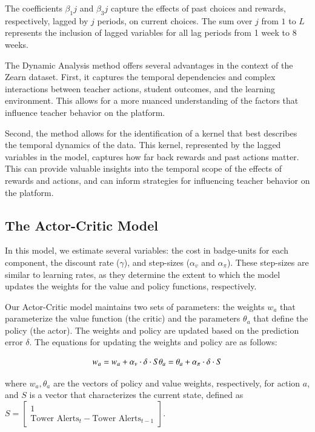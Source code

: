\documentclass[
  number,
  preprint,
  3p,
  onecolumn]{elsarticle}
\begin{document}
The coefficients \(\beta_1j\) and \(\beta_3j\) capture the effects of
past choices and rewards, respectively, lagged by \(j\) periods, on
current choices. The sum over \(j\) from \(1\) to \(L\) represents the
inclusion of lagged variables for all lag periods from 1 week to 8
weeks.

The Dynamic Analysis method offers several advantages in the context of
the Zearn dataset. First, it captures the temporal dependencies and
complex interactions between teacher actions, student outcomes, and the
learning environment. This allows for a more nuanced understanding of
the factors that influence teacher behavior on the platform.

Second, the method allows for the identification of a kernel that best
describes the temporal dynamics of the data. This kernel, represented by
the lagged variables in the model, captures how far back rewards and
past actions matter. This can provide valuable insights into the
temporal scope of the effects of rewards and actions, and can inform
strategies for influencing teacher behavior on the platform.

\hypertarget{the-actor-critic-model-1}{%
\subsection{The Actor-Critic Model}\label{the-actor-critic-model-1}}

In this model, we estimate several variables: the cost in badge-units
for each component, the discount rate (\(\gamma\)), and step-sizes
(\(\alpha_v\) and \(\alpha_\pi\)). These step-sizes are similar to
learning rates, as they determine the extent to which the model updates
the weights for the value and policy functions, respectively.

Our Actor-Critic model maintains two sets of parameters: the weights
\(w_a\) that parameterize the value function (the critic) and the
parameters \(\theta_a\) that define the policy (the actor). The weights
and policy are updated based on the prediction error \(\delta\). The
equations for updating the weights and policy are as follows:

\[
w_a = w_a + \alpha_{v} \cdot \delta \cdot S \\
\theta_a = \theta_a + \alpha_{\pi} \cdot \delta \cdot S
\]

where \(w_a, \theta_a\) are the vectors of policy and value weights,
respectively, for action \(a\), and \(S\) is a vector that characterizes
the current state, defined as
\(S = \begin{bmatrix} 1 \\ \text{Tower Alerts}_t - \text{Tower Alerts}_{t-1} \end{bmatrix}\).
\end{document}
